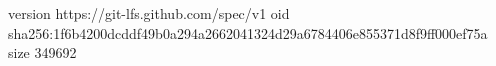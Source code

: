 version https://git-lfs.github.com/spec/v1
oid sha256:1f6b4200dcddf49b0a294a2662041324d29a6784406e855371d8f9ff000ef75a
size 349692

